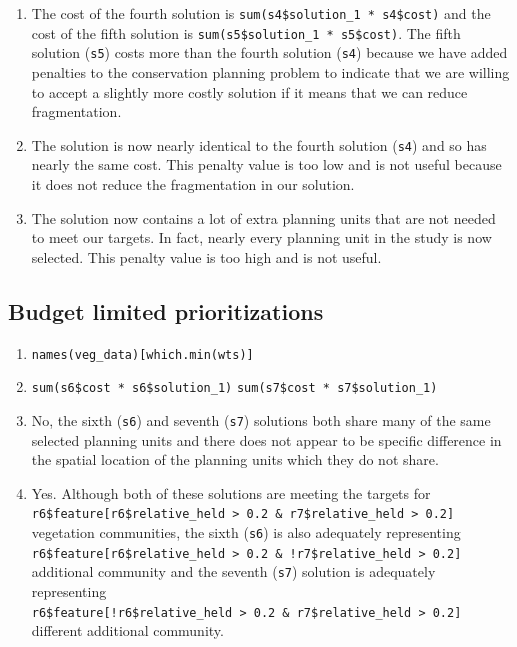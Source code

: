 \documentclass[12pt,]{book}
\providecommand{\tightlist}{%
  \setlength{\itemsep}{0pt}\setlength{\parskip}{0pt}}
\let\BeginKnitrBlock\begin \let\EndKnitrBlock\end
\begin{document}
\BeginKnitrBlock{rmdanswer}
\begin{enumerate}
\def\labelenumi{\arabic{enumi}.}
\tightlist
\item
  The cost of the fourth solution is
  \texttt{sum(s4\$solution\_1\ *\ s4\$cost)} and the cost of the fifth
  solution is \texttt{sum(s5\$solution\_1\ *\ s5\$cost)}. The fifth
  solution (\texttt{s5}) costs more than the fourth solution
  (\texttt{s4}) because we have added penalties to the conservation
  planning problem to indicate that we are willing to accept a slightly
  more costly solution if it means that we can reduce fragmentation.
\item
  The solution is now nearly identical to the fourth solution
  (\texttt{s4}) and so has nearly the same cost. This penalty value is
  too low and is not useful because it does not reduce the fragmentation
  in our solution.
\item
  The solution now contains a lot of extra planning units that are not
  needed to meet our targets. In fact, nearly every planning unit in the
  study is now selected. This penalty value is too high and is not
  useful.
\end{enumerate}
\EndKnitrBlock{rmdanswer}

\subsection{Budget limited
prioritizations}\label{budget-limited-prioritizations-1}

\BeginKnitrBlock{rmdanswer}
\begin{enumerate}
\def\labelenumi{\arabic{enumi}.}
\tightlist
\item
  \texttt{names(veg\_data){[}which.min(wts){]}}
\item
  \texttt{sum(s6\$cost\ *\ s6\$solution\_1)} \newline
   \texttt{sum(s7\$cost\ *\ s7\$solution\_1)}
\item
  No, the sixth (\texttt{s6}) and seventh (\texttt{s7}) solutions both
  share many of the same selected planning units and there does not
  appear to be specific difference in the spatial location of the
  planning units which they do not share.
\item
  Yes. Although both of these solutions are meeting the targets for
  \texttt{r6\$feature{[}r6\$relative\_held\ \textgreater{}\ 0.2\ \&\ r7\$relative\_held\ \textgreater{}\ 0.2{]}}
  vegetation communities, the sixth (\texttt{s6}) is also adequately
  representing
  \texttt{r6\$feature{[}r6\$relative\_held\ \textgreater{}\ 0.2\ \&\ !r7\$relative\_held\ \textgreater{}\ 0.2{]}}
  additional community and the seventh (\texttt{s7}) solution is
  adequately representing
  \texttt{r6\$feature{[}!r6\$relative\_held\ \textgreater{}\ 0.2\ \&\ r7\$relative\_held\ \textgreater{}\ 0.2{]}}
  different additional community.
\end{enumerate}
\EndKnitrBlock{rmdanswer}
\end{document}
